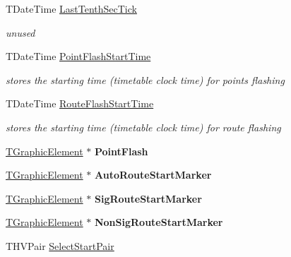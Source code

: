 \begin{DoxyCompactItemize}
T\+Date\+Time \mbox{\hyperlink{class_t_interface_ad6dd127fe91cb3d461ad30cd1113e071}{Last\+Tenth\+Sec\+Tick}}
\begin{DoxyCompactList}\small\item\em unused \end{DoxyCompactList}\item 
\mbox{\label{class_t_interface_a56a0ad081584befbe2b1c23eb5d0cc4c}} 
T\+Date\+Time \mbox{\hyperlink{class_t_interface_a56a0ad081584befbe2b1c23eb5d0cc4c}{Point\+Flash\+Start\+Time}}
\begin{DoxyCompactList}\small\item\em stores the starting time (timetable clock time) for points flashing \end{DoxyCompactList}\item 
\mbox{\label{class_t_interface_afa6d3ccd0b0978da6bc9021502f5ee60}} 
T\+Date\+Time \mbox{\hyperlink{class_t_interface_afa6d3ccd0b0978da6bc9021502f5ee60}{Route\+Flash\+Start\+Time}}
\begin{DoxyCompactList}\small\item\em stores the starting time (timetable clock time) for route flashing \end{DoxyCompactList}\item 
\mbox{\label{class_t_interface_ae6c61029b7dffb6c7605afe6ab7962fa}} 
\mbox{\hyperlink{class_t_graphic_element}{T\+Graphic\+Element}} $\ast$ {\bfseries Point\+Flash}
\item 
\mbox{\label{class_t_interface_a7265dd2213c3e1547c08b40dcbfc5960}} 
\mbox{\hyperlink{class_t_graphic_element}{T\+Graphic\+Element}} $\ast$ {\bfseries Auto\+Route\+Start\+Marker}
\item 
\mbox{\label{class_t_interface_a754caf4d08b809606767d38af81f7709}} 
\mbox{\hyperlink{class_t_graphic_element}{T\+Graphic\+Element}} $\ast$ {\bfseries Sig\+Route\+Start\+Marker}
\item 
\mbox{\label{class_t_interface_a645cf8babd05d66ad6b2ce4f11971813}} 
\mbox{\hyperlink{class_t_graphic_element}{T\+Graphic\+Element}} $\ast$ {\bfseries Non\+Sig\+Route\+Start\+Marker}
\item 
T\+H\+V\+Pair \mbox{\hyperlink{class_t_interface_a3e24148c477fe9d15568da4ae3f91204}{Select\+Start\+Pair}}

\end{DoxyCompactItemize}
